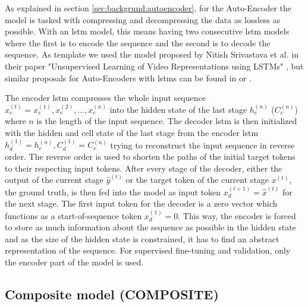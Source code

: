 As explained in section \ref{sec:backgrund:autoencoder}, for the Auto-Encoder the model is tasked with compressing and decompressing the data as lossless as possible. With an \gls{lstm} model, this means having two consecutive \gls{lstm} models where the first is to encode the sequence and the second is to decode the sequence. As template we used the model proposed by Nitish Srivastava et al. in their paper "Unsupervised Learning of Video Representations using LSTMs" \cite{unsupervised_learning_lstms}, but similar proposals for Auto-Encoders with \glspl{lstm} can be found in \cite{unsupervised_learning_lstms_timeseries} or \cite{lstm_anomaly_detection}. \par
The encoder \gls{lstm} compresses the whole input sequence $x_e^{(t)} = x_e^{(1)}, x_e^{(2)}, ..., x_e^{(n)}$ into the hidden state of the last stage $h_e^{(n)}$ ($C_e^{(n)}$) where $n$ is the length of the input sequence. The decoder \gls{lstm} is then initialized with the hidden and cell state of the last stage from the encoder \gls{lstm} $h_d^{(1)} = h_e^{(n)}, C_d^{(1)} = C_e^{(n)}$ trying to reconstruct the input sequence in reverse order. The reverse order is used to shorten the paths of the initial target tokens to their respecting input tokens. After every stage of the decoder, either the output of the current stage $\hat{y}^{(t)}$ or the target token of the current stage $x^{(t)}$, the ground truth, is then fed into the model as input token  $x_d^{(t+1)} = \hat{x}^{(t)}$ for the next stage. The first input token for the decoder is a zero vector which functions as a start-of-sequence token $x_d^{(1)} = 0$. This way, the encoder is forced to store as much information about the sequence as possible in the hidden state and as the size of the hidden state is constrained, it has to find an abstract representation of the sequence. For supervised fine-tuning and validation, only the encoder part of the model is used. 

\subsection{Composite model (COMPOSITE)} \label{sec:experiments:lstm:composite}

